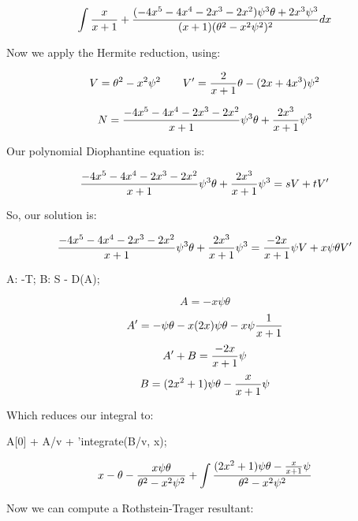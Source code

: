 $$\int {x\over{x+1}} + {{(-4x^5-4x^4-2x^3-2x^2)\psi^3\theta + {2x^3}\psi^3}\over{(x+1)(\theta^2 - x^2\psi^2)^2}} dx$$

Now we apply the Hermite reduction, using:

$$V = \theta^2 - x^2\psi^2 \qquad V' = {2\over{x+1}}\theta - (2x+4x^3)\psi^2$$

$$N = {{{-4x^5-4x^4-2x^3-2x^2}\over{x+1}}\psi^3\theta + {{2x^3}\over{x+1}}\psi^3} $$

\vfill\eject

Our polynomial Diophantine equation is:

$${{{-4x^5-4x^4-2x^3-2x^2}\over{x+1}}\psi^3\theta + {{2x^3}\over{x+1}}\psi^3}
  = sV + tV'$$


So, our solution is:

$${{{-4x^5-4x^4-2x^3-2x^2}\over{x+1}}\psi^3\theta + {{2x^3}\over{x+1}}\psi^3}
  = {-2x\over{x+1}}\psi V + x\psi\theta V'$$

\begin{maximacode}
A: -T;
B: S - D(A);
\end{maximacode}

$$A = -x\psi\theta$$
$$A' = -\psi\theta - x(2x)\psi\theta - x\psi{1\over{x+1}}$$
$$A' + B = {-2x\over{x+1}}\psi$$
$$B = (2x^2+1)\psi\theta - {x\over{x+1}}\psi$$

Which reduces our integral to:

\begin{maximacode}
A[0] + A/v + 'integrate(B/v, x);
\end{maximacode}


{\LARGE$$x - \theta - {x\psi\theta\over{\theta^2-x^2\psi^2}} +  \int{{(2x^2+1)\psi\theta - {x\over{x+1}}\psi}\over{\theta^2-x^2\psi^2}}$$}



Now we can compute a Rothstein-Trager resultant:

